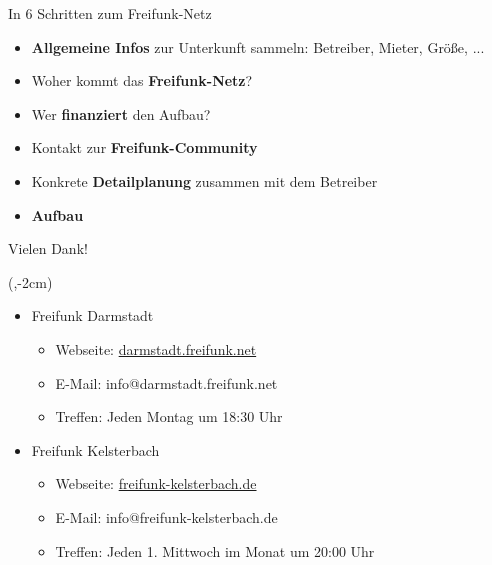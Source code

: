 \documentclass[t]{beamer}
\begin{document}
  \begin{frame}{In 6 Schritten zum Freifunk-Netz}
    \begin{itemize}
      \pause
      \item \textbf{Allgemeine Infos} zur Unterkunft sammeln: Betreiber, Mieter, Größe, ...
      \pause
      \item Woher kommt das \textbf{Freifunk-Netz}?
      \pause
      \item Wer \textbf{finanziert} den Aufbau?
      \pause
      \item Kontakt zur \textbf{Freifunk-Community}
      \pause
      \item Konkrete \textbf{Detailplanung} zusammen mit dem Betreiber
      \pause
      \item \textbf{Aufbau}
    \end{itemize}
  \end{frame}


  \begin{frame}{Vielen Dank!}
    \begin{textblock*}{0cm}(\textwidth-2cm,-2cm)
      \begin{figure}[h]
        \def\svgwidth{2.5cm}
        
      \end{figure}
    \end{textblock*}
    \begin{itemize}
      \item Freifunk Darmstadt
      \begin{itemize}
        \item Webseite: \href{http://darmstadt.freifunk.net/}{darmstadt.freifunk.net}
        \item E-Mail: info@darmstadt.freifunk.net
        \item Treffen: Jeden Montag um 18:30 Uhr
      \end{itemize}
      \vspace{0.5em}
      \item Freifunk Kelsterbach
      \begin{itemize}
        \item Webseite: \href{http://freifunk-kelsterbach.de}{freifunk-kelsterbach.de}
        \item E-Mail: info@freifunk-kelsterbach.de
        \item Treffen: Jeden 1. Mittwoch im Monat um 20:00 Uhr
      \end{itemize}
    \end{itemize}
  \end{frame}
\end{document}
